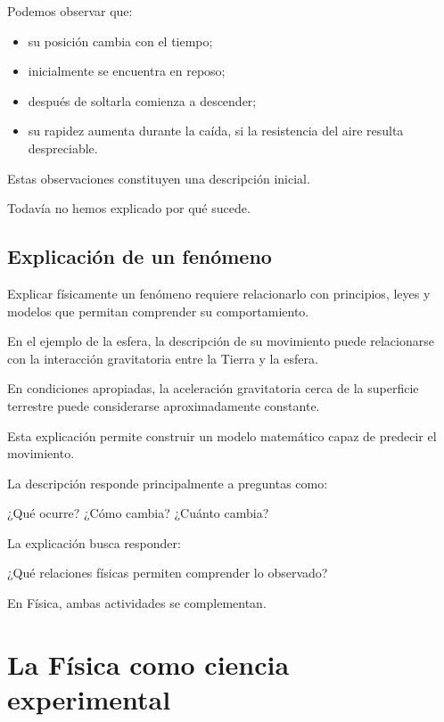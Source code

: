 Podemos observar que:

\begin{itemize}
    \item su posición cambia con el tiempo;
    \item inicialmente se encuentra en reposo;
    \item después de soltarla comienza a descender;
    \item su rapidez aumenta durante la caída, si la resistencia
    del aire resulta despreciable.
\end{itemize}

Estas observaciones constituyen una descripción inicial.

Todavía no hemos explicado por qué sucede.

\subsection{Explicación de un fenómeno}

Explicar físicamente un fenómeno requiere relacionarlo
con principios, leyes y modelos que permitan comprender
su comportamiento.

En el ejemplo de la esfera, la descripción de su movimiento
puede relacionarse con la interacción gravitatoria
entre la Tierra y la esfera.

En condiciones apropiadas, la aceleración gravitatoria
cerca de la superficie terrestre puede considerarse
aproximadamente constante.

Esta explicación permite construir un modelo matemático
capaz de predecir el movimiento.

\begin{idea}

La descripción responde principalmente a preguntas como:

\begin{center}
¿Qué ocurre? ¿Cómo cambia? ¿Cuánto cambia?
\end{center}

La explicación busca responder:

\begin{center}
¿Qué relaciones físicas permiten comprender lo observado?
\end{center}

En Física, ambas actividades se complementan.

\end{idea}


\section{La Física como ciencia experimental}

